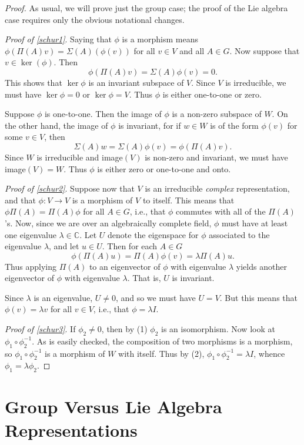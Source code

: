 \documentclass[12pt]{amsbook}
\theoremstyle{plain}
\numberwithin{equation}{chapter}
\numberwithin{theorem}{chapter}
\begin{document}
\begin{proof}
As usual, we will prove just the group case; the proof of the Lie algebra case
requires only the obvious notational changes.

\textit{Proof of \ref{schur1}}. Saying that $\phi$ is a morphism means
$\phi(\Pi(A)v)=\Sigma(A)\left(  \phi(v)\right)  $ for all $v\in V$ and all
$A\in G$. Now suppose that $v\in\ker(\phi)$. Then
\[
\phi(\Pi(A)v)=\Sigma(A)\phi(v)=0\text{.}%
\]
This shows that $\ker\phi$ is an invariant subspace of $V$. Since $V$ is
irreducible, we must have $\ker\phi=0$ or $\ker\phi=V$. Thus $\phi$ is either
one-to-one or zero.

Suppose $\phi$ is one-to-one. Then the image of $\phi$ is a non-zero subspace
of $W$. On the other hand, the image of $\phi$ is invariant, for if $w\in W$
is of the form $\phi(v)$ for some $v\in V$, then
\[
\Sigma(A)w=\Sigma(A)\phi(v)=\phi(\Pi(A)v)\text{.}%
\]
Since $W$ is irreducible and image$(V)$ is non-zero and invariant, we must
have image$(V)=W$. Thus $\phi$ is either zero or one-to-one and onto.

\textit{Proof of \ref{schur2}}. Suppose now that $V$ is an irreducible
\textit{complex} representation, and that $\phi:V\rightarrow V$ is a morphism
of $V$ to itself. This means that $\phi\Pi(A)=\Pi(A)\phi$ for all $A\in G$,
i.e., that $\phi$ commutes with all of the $\Pi(A)$'s. Now, since we are over
an algebraically complete field, $\phi$ must have at least one eigenvalue
$\lambda\in\mathbb{C}$. Let $U$ denote the eigenspace for $\phi$ associated to
the eigenvalue $\lambda$, and let $u\in U$. Then for each $A\in G$%
\[
\phi\left(  \Pi(A)u\right)  =\Pi(A)\phi(v)=\lambda\Pi(A)u\text{.}%
\]
Thus applying $\Pi(A)$ to an eigenvector of $\phi$ with eigenvalue $\lambda$
yields another eigenvector of $\phi$ with eigenvalue $\lambda$. That is, $U$
is invariant.

Since $\lambda$ is an eigenvalue, $U\neq0$, and so we must have $U=V$. But
this means that $\phi(v)=\lambda v$ for all $v\in V$, i.e., that $\phi=\lambda
I$.

\textit{Proof of \ref{schur3}}. If $\phi_{2}\neq0$, then by (1) $\phi_{2}$ is
an isomorphism. Now look at $\phi_{1}\circ\phi_{2}^{-1}$. As is easily
checked, the composition of two morphisms is a morphism, so $\phi_{1}\circ
\phi_{2}^{-1}$ is a morphism of $W$ with itself. Thus by (2), $\phi_{1}%
\circ\phi_{2}^{-1}=\lambda I$, whence $\phi_{1}=\lambda\phi_{2}$.
\end{proof}

\section{Group Versus Lie Algebra Representations\label{group.algebra}}
\end{document}
